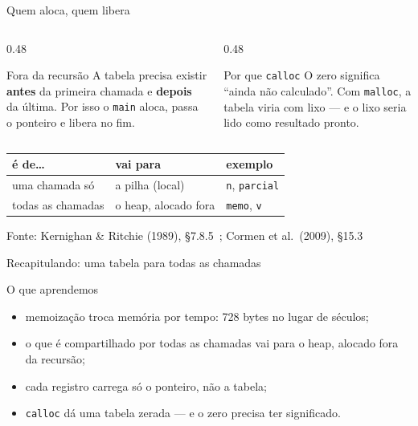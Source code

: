 \documentclass[aspectratio=169]{beamer}
\newcommand{\fonte}[1]{\vfill\hfill{\scriptsize\textcolor{UFSGray}{Fonte: #1}}}
\begin{document}
\begin{frame}{Quem aloca, quem libera}
  \begin{columns}[T]
    \begin{column}{0.48\textwidth}
      \begin{block}{Fora da recursão}
        \small A tabela precisa existir \textbf{antes} da primeira chamada e
        \textbf{depois} da última. Por isso o \texttt{main} aloca, passa o
        ponteiro e libera no fim.
      \end{block}
    \end{column}
    \begin{column}{0.48\textwidth}
      \begin{block}{Por que \texttt{calloc}}
        \small O zero significa ``ainda não calculado''. Com
        \texttt{malloc}, a tabela viria com lixo --- e o lixo seria lido como
        resultado pronto.
      \end{block}
    \end{column}
  \end{columns}
  \medskip
  \begin{center}
    \small
    \begin{tabular}{@{}lll@{}}
      \toprule
      é de\ldots & vai para & exemplo\\
      \midrule
      uma chamada só & a pilha (local) & \texttt{n}, \texttt{parcial}\\
      todas as chamadas & o heap, alocado fora & \texttt{memo}, \texttt{v}\\
      \bottomrule
    \end{tabular}
  \end{center}
  \fonte{Kernighan \& Ritchie (1989), §7.8.5~\cite{kernighan1989c};
    Cormen et al.\ (2009), §15.3~\cite{cormen2009introduction}}
\end{frame}

\begin{frame}{Recapitulando: uma tabela para todas as chamadas}
  \begin{block}{O que aprendemos}
    \begin{itemize}
      \item memoização troca memória por tempo: 728 bytes no lugar de
        séculos;
      \item o que é compartilhado por todas as chamadas vai para o heap,
        alocado fora da recursão;
      \item cada registro carrega só o ponteiro, não a tabela;
      \item \texttt{calloc} dá uma tabela zerada --- e o zero precisa ter
        significado.
    \end{itemize}
  \end{block}
\end{frame}
\end{document}
